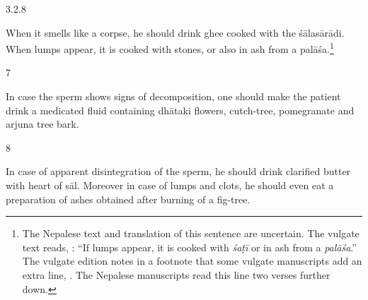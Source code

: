 \begin{translation}
 \item [3.2.8]
 
\begin{sloka}
     When it smells like a corpse, he should drink ghee cooked with the
\gls{śālasārādi}. %
\dag When lumps appear, it is cooked with stones, or also in ash from a
\gls{palāśa}.\footnote{The Nepalese text and translation of this sentence
    are uncertain. The vulgate text reads, :  “If lumps appear, it is cooked with
    \emph{śaṭī} or in ash from a \emph{palāśa}.”  The vulgate edition notes in a 
    footnote that some vulgate manuscripts add an extra line, . The Nepalese manuscripts read this line two verses 
    further 
    down.}

\end{sloka} 
 
% 
 
 
 
  \begin{tt}
     \bigskip
     \raggedright
 
 \item[7]
 
  In case the sperm shows signs of decomposition, one should make the patient 
  drink a medicated fluid containing dhātaki flowers, cutch-tree, pomegranate 
  and arjuna tree bark.
 
 \item[8]
 
  In case of apparent disintegration of the sperm, he should drink clarified butter 
  with heart of sāl. Moreover in case of lumps and clots, he should even eat a 
  preparation of ashes obtained after burning of a fig-tree.
 

\end{tt}
\end{translation}
